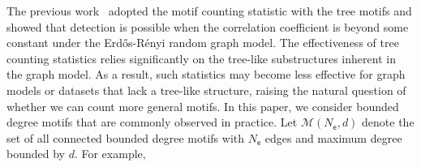 \documentclass[letterpaper,11pt]{article}
\theoremstyle{definition}
\newcommand{\maM}{\mathcal{M}}
\newcommand{\sfe}{{\mathsf{e}}}
\newcommand{\ER}{Erd\H{o}s-R\'enyi }
\begin{document}
The previous work~\cite{mao2024testing} adopted the motif counting statistic with the tree motifs and showed that detection is possible when the correlation coefficient is beyond some constant under the \ER random graph model. %
The effectiveness of tree counting statistics relies significantly on the tree-like substructures inherent in the graph model.
As a result, such statistics may become less effective for graph models or datasets that lack a tree-like structure,
raising the natural question of whether we can count more general motifs.
In this paper, we consider bounded degree motifs that are commonly observed in practice. Let $\maM(N_\sfe,d)$ denote the set of all connected bounded degree motifs with $N_\sfe$ edges and maximum degree bounded by $d$. For example, 
\end{document}

